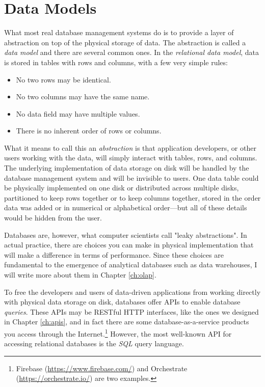\documentclass[11pt]{book}
\newcommand{\term}[1]{\emph{#1}} %
\begin{document}
\section{Data Models}
What most real database management systems do is to provide a layer of abstraction on top of the physical storage of data.  The abstraction is called a \term{data model} and there are several common ones.  In the \term{relational data model}, data is stored in tables with rows and columns, with a few very simple rules:

\begin{itemize}
    \item No two rows may be identical.
    \item No two columns may have the same name.
    \item No data field may have multiple values.
    \item There is no inherent order of rows or columns.
\end{itemize}

What it means to call this an \term{abstraction} is that application developers, or other users working with the data, will simply interact with tables, rows, and columns.  The underlying implementation of data storage on disk will be handled by the database management system and will be invisible to users.  One data table could be physically implemented on one disk or distributed across multiple disks, partitioned to keep rows together or to keep columns together, stored in the order data was added or in numerical or alphabetical order---but all of these details would be hidden from the user.

Databases are, however, what computer scientists call "leaky abstractions".  In actual practice, there are choices you can make in physical implementation that will make a difference in terms of performance.  Since these choices are fundamental to the emergence of analytical databases such as data warehouses, I will write more about them in Chapter \ref{ch:olap}.

To free the developers and users of data-driven applications from working directly with physical data storage on disk, databases offer APIs to enable database \term{queries}.  These APIs may be RESTful HTTP interfaces, like the ones we designed in Chapter \ref{ch:apis}, and in fact there are some database-as-a-service products you access through the Internet.\footnote{Firebase (\url{https://www.firebase.com/}) and Orchestrate (\url{https://orchestrate.io/}) are two examples.}  However, the most well-known API for accessing relational databases is the \term{SQL} query language.
\end{document}
